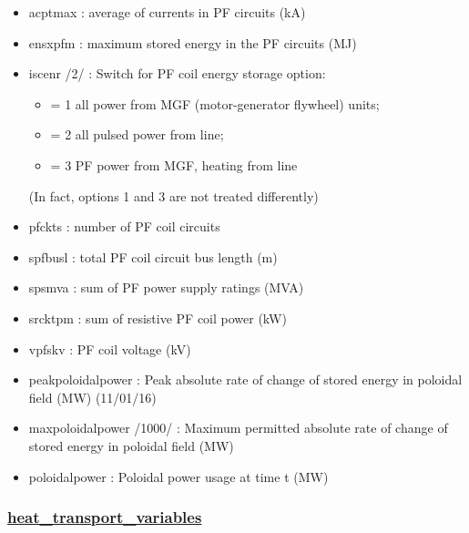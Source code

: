 \documentclass[]{article}
\providecommand{\tightlist}{%
  \setlength{\itemsep}{0pt}\setlength{\parskip}{0pt}}
\begin{document}
\begin{itemize}
\tightlist
\item
  acptmax : average of currents in PF circuits (kA)
\item
  ensxpfm : maximum stored energy in the PF circuits (MJ)
\item
  iscenr /2/ : Switch for PF coil energy storage option:

  \begin{itemize}
  \tightlist
  \item
    = 1 all power from MGF (motor-generator flywheel) units;
  \item
    = 2 all pulsed power from line;
  \item
    = 3 PF power from MGF, heating from line
  \end{itemize}

  (In fact, options 1 and 3 are not treated differently)
\item
  pfckts : number of PF coil circuits
\item
  spfbusl : total PF coil circuit bus length (m)
\item
  spsmva : sum of PF power supply ratings (MVA)
\item
  srcktpm : sum of resistive PF coil power (kW)
\item
  vpfskv : PF coil voltage (kV)
\item
  peakpoloidalpower : Peak absolute rate of change of stored energy in
  poloidal field (MW) (11/01/16)
\item
  maxpoloidalpower /1000/ : Maximum permitted absolute rate of change of
  stored energy in poloidal field (MW)
\item
  poloidalpower : Poloidal power usage at time t (MW)
\end{itemize}

\hypertarget{heat_transport_variables}{%
\subsubsection{\texorpdfstring{\href{heat_transport_variables.html}{heat\_transport\_variables}}{heat\_transport\_variables}}\label{heat_transport_variables}}
\end{document}
